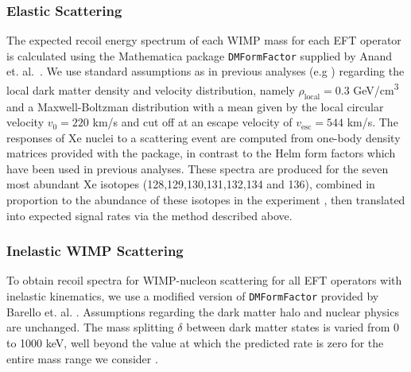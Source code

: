 \subsubsection{Elastic Scattering}
\label{subsubsec:Elastic}

The expected recoil energy spectrum of each WIMP mass for each EFT operator is calculated using the Mathematica package \texttt{DMFormFactor} supplied by Anand et. al.~\cite{Fitzpatrick:MathTools,Anand:MathTools}. We use standard assumptions as in previous analyses (e.g \cite{xe100_run_combination}) regarding the local dark matter density and velocity distribution, namely $\rho_\mathrm{local} = 0.3$ GeV/cm\textsuperscript{3} and a Maxwell-Boltzman distribution with a mean given by the local circular velocity $v_0 = 220$ km/s and cut off at an escape velocity of $v_\mathrm{esc} = 544$ km/s. The responses of Xe nuclei to a scattering event are computed from one-body density matrices provided with the package, in contrast to the Helm form factors which have been used in previous analyses. These spectra are produced for the seven most abundant Xe isotopes (128,129,130,131,132,134 and 136), combined in proportion to the abundance of these isotopes in the experiment \cite{xe100_run10_sd}, then translated into expected signal rates via the method described above.

\subsubsection{Inelastic WIMP Scattering}
\label{subsubsec:Inelastic}

To obtain recoil spectra for WIMP-nucleon scattering for all EFT operators with inelastic kinematics, we use a modified version of \texttt{DMFormFactor} provided by Barello et. al. \cite{InelasticMath}. Assumptions regarding the dark matter halo and nuclear physics are unchanged. The mass splitting $\delta$ between dark matter states is varied from 0 to 1000 keV, well beyond the value at which the predicted rate is zero for the entire mass range we consider .
